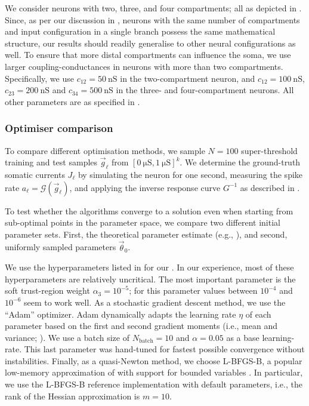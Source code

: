 We consider \nlif neurons with two, three, and four compartments; all as depicted in .
Since, as per our discussion in , \nlif neurons with the same number of compartments and input configuration in a single branch possess the same mathematical structure, our results should readily generalise to other neural configurations as well.
To ensure that more distal compartments can influence the soma, we use larger coupling-conductances in neurons with more than two compartments.
Specifically, we use $c_{12} = \SI{50}{\nano\siemens}$ in the two-compartment \LIF neuron, and $c_{12} = \SI{100}{\nano\siemens}$, $c_{23} = \SI{200}{\nano\siemens}$ and $c_{34} = \SI{500}{\nano\siemens}$ in the three- and four-compartment neurons.
All other parameters are as specified in .

\subsubsection{Optimiser comparison}
To compare different optimisation methods, we sample $N = 100$ super-threshold training and test samples $\vec g_\ell$ from $[\SI{0}{\micro\siemens}, \SI{1}{\micro\siemens}]^k$.
We determine the ground-truth somatic currents $J_\ell$ by simulating the neuron for one second, measuring the spike rate $a_\ell = \mathscr{G}(\vec g_\ell)$, and applying the inverse response curve $G^{-1}$ as described in .

To test whether the algorithms converge to a solution even when starting from sub-optimal points in the parameter space, we compare two different initial parameter sets.
First, the theoretical parameter estimate (e.g., ), and second, uniformly sampled parameters $\vec \theta_0$.

We use the hyperparameters listed in  for our \QP.
In our experience, most of these hyperparameters are relatively uncritical.
The most important parameter is the soft trust-region weight $\alpha_3 = 10^{-5}$; for this parameter values between $10^{-4}$ and $10^{-6}$ seem to work well.
As a stochastic gradient descent method, we use the \enquote{Adam} optimizer.
Adam dynamically adapts the learning rate $\eta$ of each parameter based on the first and second gradient moments (i.e., mean and variance; \cite{kingma2015adam}).
We use a batch size of $N_\mathrm{batch} = 10$ and $\alpha = 0.05$ as a base learning-rate.
This last parameter was hand-tuned for fastest possible convergence without instabilities.
Finally, as a quasi-Newton method, we choose L-BFGS-B, a popular low-memory approximation of \BFGS with support for bounded variables \citep{byrd1995limited}.
In particular, we use the L-BFGS-B reference implementation with default parameters, i.e., the rank of the Hessian approximation is $m = 10$.

